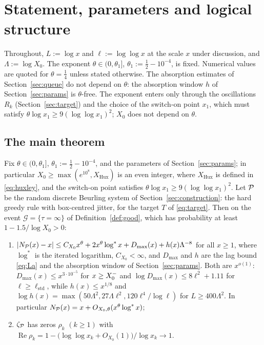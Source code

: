 \section{Statement, parameters and logical structure}\label{sec:setup}

Throughout, $L:=\log x$ and $\ell:=\log\log x$ at the scale $x$ under discussion, and $\Lambda:=\log X_0$. The exponent
$\theta\in(0,\theta_1]$, $\theta_1:=\tfrac12-10^{-4}$, is fixed. Numerical values are quoted for $\theta=\tfrac14$ unless stated
otherwise. The absorption estimates of Section~\ref{sec:queue} do not depend on $\theta$: the absorption window $h$ of
Section~\ref{sec:params} is $\theta$-free. The exponent enters only through the oscillations $R_k$ (Section~\ref{sec:target}) and the
choice of the switch-on point $x_1$, which must satisfy $\theta\log x_1\ge9(\log\log x_1)^2$; $X_0$ does not depend on $\theta$.

\subsection{The main theorem}
\begin{theorem}[Theorem A]\label{thm:A}
Fix $\theta\in(0,\theta_1]$, $\theta_1:=\tfrac12-10^{-4}$, and the parameters of Section~\ref{sec:params}; in particular
$X_0\ge\max(e^{10^8},X_{\mathrm{Hux}})$ is an even integer, where $X_{\mathrm{Hux}}$ is defined in \eqref{eq:huxley}, and the switch-on
point satisfies $\theta\log x_1\ge9(\log\log x_1)^2$. Let $\mathcal{P}$ be the random discrete
Beurling system of Section~\ref{sec:construction}: the hard greedy rule with box-centred jitter, for the target $T$ of
\eqref{eq:target}. Then on the event $\mathcal G=\{\tau=\infty\}$ of Definition~\ref{def:good}, which has probability at least
$1-1.5/\log X_0>0$:
\begin{enumerate}[label=(\roman*)]
\item $|N_{\mathcal{P}}(x)-x|\le C_{X_0}x^{\theta}+2x^{\theta}\log^*x+D_{\max}(x)+h(x)\Lambda^{-8}$ for all $x\ge1$, where $\log^*$ is the
iterated logarithm, $C_{X_0}<\infty$, and $D_{\max}$ and $h$ are the lag bound \eqref{eq:La} and the absorption window of
Section~\ref{sec:params}. Both are $x^{o(1)}$: $D_{\max}(x)\le x^{3\cdot10^{-5}}$ for $x\ge X_0^{-}$ and $\log D_{\max}(x)\le8\ell^2+1.11$ for
$\ell\ge\ell_{\mathrm{std}}$, while $h(x)\le x^{1/8}$ and $\log h(x)=\max(50\Lambda^2,27\Lambda\ell^2,120\ell^4/\log\ell)$ for
$L\ge400\Lambda^2$. In particular $N_{\mathcal{P}}(x)=x+O_{X_0,\theta}(x^{\theta}\log^*x)$;
\item $\zeta_{\mathcal{P}}$ has zeros $\rho_k$ $(k\ge1)$ with
$\operatorname{Re}\rho_k=1-\bigl(\log\log x_k+O_{X_0}(1)\bigr)/\log x_k\to1$.
\end{enumerate}
\end{theorem}

